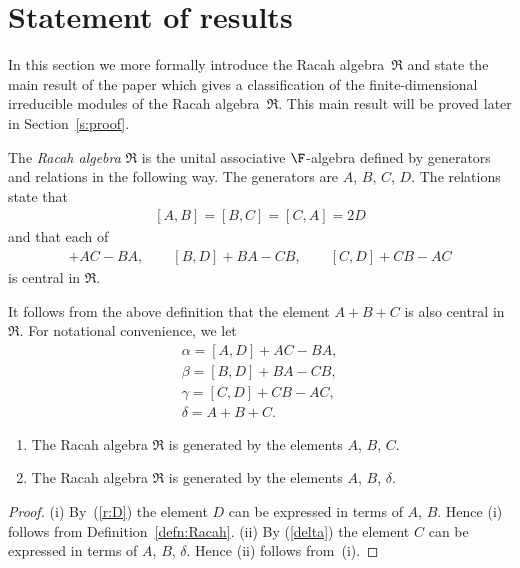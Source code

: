 \section{Statement of results}\label{s:classification}
In this section we more formally introduce the Racah algebra~$\Re$ and state the main result of the paper which gives a classification of the finite-dimensional irreducible modules of the Racah algebra~$\Re$. This main result will be proved later in Section~\ref{s:proof}.

\begin{Definition}[{\cite[Definition 3.1]{SH:2017-1}}] \label{defn:Racah}
The {\it Racah algebra} $\Re$ is the unital associative $\F$-algebra defined by generators and relations in the following way. The generators are $A$, $B$, $C$, $D$. The relations state that
\begin{gather}\label{r:D}
[A,B]=[B,C]=[C,A]=2D
\end{gather}
and that each of
\begin{gather*}
[A,D]+AC-BA, \qquad [B,D]+BA-CB, \qquad[C,D]+CB-AC
\end{gather*}
is central in $\Re$.
\end{Definition}
It follows from the above definition that the element $A+B+C$ is also central in $\Re$. For notational convenience, we let
\begin{gather}
\alpha = [A,D]+AC-BA, \label{alpha} \\
\beta = [B,D]+BA-CB,\label{beta}\\
\gamma = [C,D]+CB-AC,\label{gamma}\\
\delta = A+B+C. \label{delta}
\end{gather}

\begin{Lemma}\label{lem:delta}\quad
\begin{enumerate}\itemsep=0pt
\item[$(i)$] The Racah algebra $\Re$ is generated by the elements $A$, $B$, $C$.
\item[$(ii)$] The Racah algebra $\Re$ is generated by the elements $A$, $B$, $\delta$.
\end{enumerate}
\end{Lemma}
\begin{proof}
(i) By~(\ref{r:D}) the element $D$ can be expressed in terms of $A$, $B$. Hence (i) follows from Definition~\ref{defn:Racah}.
(ii) By (\ref{delta}) the element $C$ can be expressed in terms of $A$, $B$, $\delta$. Hence (ii) follows from~(i).
\end{proof}


